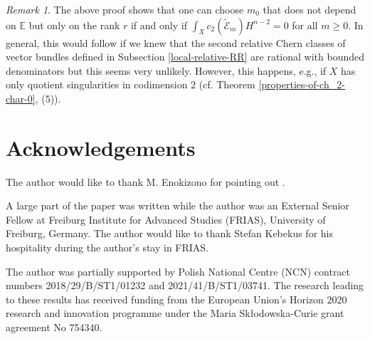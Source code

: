 \documentclass[twoside, 11pt]{article}
\theoremstyle{plain}
\theoremstyle{definition}
\theoremstyle{remark}
\newtheorem{Remark}[Thm]{Remark}
\newcommand{\EE}{{\mathbb E}}
\newcommand{\cE}{{\mathcal E}}
\begin{document}
\begin{Remark}
The above proof shows that one can choose $m_0$ that does not depend on $\EE$ but only on the rank $r$ if and only if  $\int _{X}c_2 (\tilde \cE _{m})H^{n-2} =0$ for all $m\ge 0$. In general, this would follow if we knew that the second relative Chern classes of vector bundles defined in Subsection \ref{local-relative-RR} are rational with bounded denominators but this seems very unlikely.  However, this happens, e.g., if $X$ has only quotient singularities in codimension $2$ (cf. Theorem \ref{properties-of-ch_2-char-0}, (5)).
\end{Remark}






\section*{Acknowledgements}

The author would like to thank M. Enokizono for pointing out \cite{En}.


A large part of the paper was written while the author was an External Senior Fellow at Freiburg Institute for Advanced Studies (FRIAS), University of Freiburg, Germany. 
The author would like to thank Stefan Kebekus for his hospitality during the author's stay in FRIAS.

The  author was partially supported by Polish National Centre (NCN) contract numbers 2018/29/B/ST1/01232 and 2021/41/B/ST1/03741. 
The research leading to these results has received funding from the European Union's Horizon 2020 research and innovation programme under the Maria Sk{\l}o\-do\-wska-Curie grant agreement No 754340.
\end{document}
